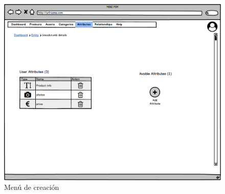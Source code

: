 \begin{figure}[H]
    \includegraphics[width=1\linewidth]{mockups/RF6.2Leer_Atributo.png}
    \caption{Menú de creación}
   \end{figure}
\vspace{1.0cm}

\newpage %